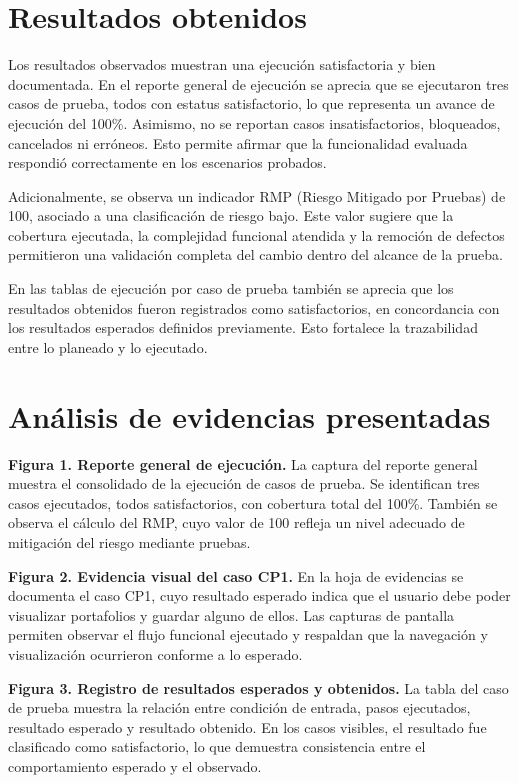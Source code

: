\documentclass[12pt]{article}
\begin{document}
\section*{Resultados obtenidos}

Los resultados observados muestran una ejecución satisfactoria y bien documentada. En el reporte general de ejecución se aprecia que se ejecutaron tres casos de prueba, todos con estatus satisfactorio, lo que representa un avance de ejecución del 100\%. Asimismo, no se reportan casos insatisfactorios, bloqueados, cancelados ni erróneos. Esto permite afirmar que la funcionalidad evaluada respondió correctamente en los escenarios probados.

Adicionalmente, se observa un indicador RMP (Riesgo Mitigado por Pruebas) de 100, asociado a una clasificación de riesgo bajo. Este valor sugiere que la cobertura ejecutada, la complejidad funcional atendida y la remoción de defectos permitieron una validación completa del cambio dentro del alcance de la prueba.

En las tablas de ejecución por caso de prueba también se aprecia que los resultados obtenidos fueron registrados como satisfactorios, en concordancia con los resultados esperados definidos previamente. Esto fortalece la trazabilidad entre lo planeado y lo ejecutado.

\section*{Análisis de evidencias presentadas}

\textbf{Figura 1. Reporte general de ejecución.} La captura del reporte general muestra el consolidado de la ejecución de casos de prueba. Se identifican tres casos ejecutados, todos satisfactorios, con cobertura total del 100\%. También se observa el cálculo del RMP, cuyo valor de 100 refleja un nivel adecuado de mitigación del riesgo mediante pruebas.

\textbf{Figura 2. Evidencia visual del caso CP1.} En la hoja de evidencias se documenta el caso CP1, cuyo resultado esperado indica que el usuario debe poder visualizar portafolios y guardar alguno de ellos. Las capturas de pantalla permiten observar el flujo funcional ejecutado y respaldan que la navegación y visualización ocurrieron conforme a lo esperado.

\textbf{Figura 3. Registro de resultados esperados y obtenidos.} La tabla del caso de prueba muestra la relación entre condición de entrada, pasos ejecutados, resultado esperado y resultado obtenido. En los casos visibles, el resultado fue clasificado como satisfactorio, lo que demuestra consistencia entre el comportamiento esperado y el observado.
\end{document}
